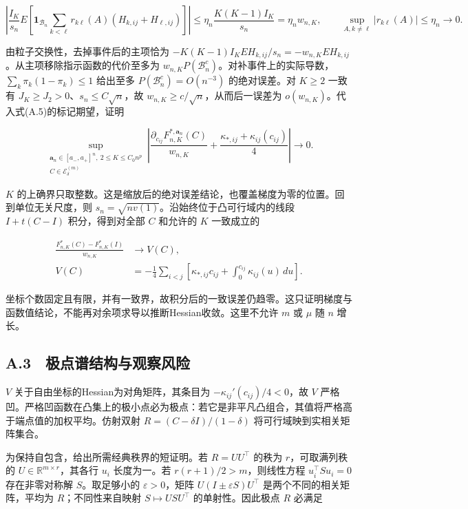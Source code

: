 \documentclass[11pt,a4paper]{article}
\begin{document}
\[
\left|\frac{I_K}{s_n}E\!\left[
\mathbf1_{\mathcal B_n}\sum_{k<\ell}
 r_{k\ell}(A)(H_{k,ij}+H_{\ell,ij})\right]\right|
\le \eta_n\frac{K(K-1)I_K}{s_n}=\eta_n w_{n,K},\qquad
\sup_{A,k\ne\ell}|r_{k\ell}(A)|\le\eta_n\longrightarrow0.
\]

由粒子交换性，去掉事件后的主项恰为
\(-K(K-1)I_KEH_{k,ij}/s_n=-w_{n,K}EH_{k,ij}\)。从主项移除指示函数的代价至多为
\(w_{n,K}P(\mathcal B_n^c)\)。对补事件上的实际导数，\(\sum_k\pi_k(1-\pi_k)\le1\)
给出至多 \(P(\mathcal B_n^c)=O(n^{-3})\) 的绝对误差。对 \(K\ge2\) 一致有
\(J_K\ge J_2>0\)、\(s_n\le C\sqrt n\)，故
\(w_{n,K}\ge c/\sqrt n\)，从而后一误差为
\(o(w_{n,K})\)。代入式(A.5)的标记期望，证明

\[
\sup_{\substack{\mathbf a_n\in[a_-,a_+]^n,\ 2\le K\le C_0n^p\\
C\in\mathcal E_\delta^{(m)}}}
\left|\frac{\partial_{c_{ij}}F_{n,K}^{*,\mathbf a_n}(C)}{w_{n,K}}
+\frac{\kappa_{*,ij}+\kappa_{ij}(c_{ij})}{4}\right|\to0 .
\tag{A.15}
\]

\(K\)
的上确界只取整数。这是缩放后的绝对误差结论，也覆盖梯度为零的位置。回到单位无关尺度，则
\(s_n=\sqrt{nv(1)}\)。沿始终位于凸可行域内的线段 \(I+t(C-I)\)
积分，得到对全部 \(C\) 和允许的 \(K\) 一致成立的

\[
\begin{aligned}
\frac{F_{n,K}^*(C)-F_{n,K}^*(I)}{w_{n,K}}&\longrightarrow V(C),\\
V(C)&=-\frac14\sum_{i<j}
\left[\kappa_{*,ij}c_{ij}+\int_0^{c_{ij}}\kappa_{ij}(u)\,du\right].
\end{aligned}
\tag{A.16}
\]

坐标个数固定且有限，并有一致界，故积分后的一致误差仍趋零。这只证明梯度与函数值结论，不能再对余项求导以推断Hessian收敛。这里不允许
\(m\) 或 \(\mu\) 随 \(n\) 增长。

\subsection*{A.3　极点谱结构与观察风险}\label{a.3-ux6781ux70b9ux8c31ux7ed3ux6784ux4e0eux89c2ux5bdfux98ceux9669}

\(V\) 关于自由坐标的Hessian为对角矩阵，其条目为
\(-\kappa_{ij}'(c_{ij})/4<0\)，故 \(V\)
严格凹。严格凹函数在凸集上的极小点必为极点：若它是非平凡凸组合，其值将严格高于端点值的加权平均。仿射双射
\(R=(C-\delta I)/(1-\delta)\) 将可行域映到实相关矩阵集合。

为保持自包含，给出所需经典秩界的短证明。若 \(R=UU^\top\) 的秩为
\(r\)，可取满列秩的 \(U\in\mathbb R^{m\times r}\)，其各行 \(u_i\)
长度为一。若 \(r(r+1)/2>m\)，则线性方程 \(u_i^\top S u_i=0\)
存在非零对称解 \(S\)。取足够小的 \(\varepsilon>0\)，矩阵
\(U(I\pm\varepsilon S)U^\top\) 是两个不同的相关矩阵，平均为
\(R\)；不同性来自映射 \(S\mapsto USU^\top\) 的单射性。因此极点 \(R\)
必满足
\end{document}
